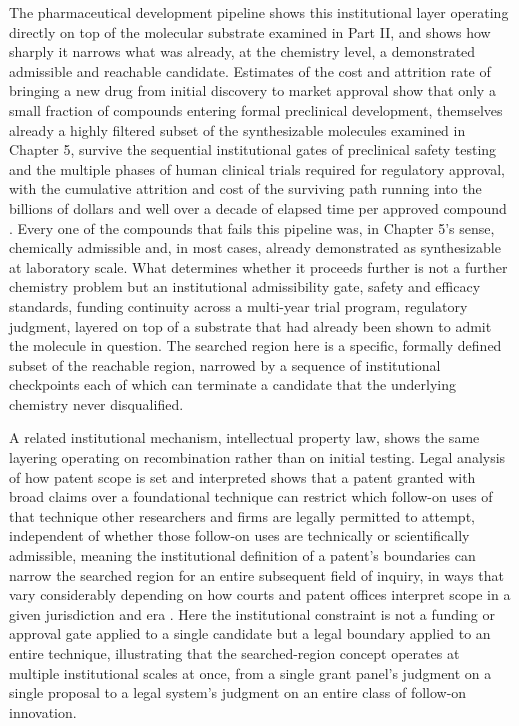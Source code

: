 \documentclass[11pt]{book}
\begin{document}
The pharmaceutical development pipeline shows this institutional layer operating directly on top of the molecular substrate examined in Part II, and shows how sharply it narrows what was already, at the chemistry level, a demonstrated admissible and reachable candidate. Estimates of the cost and attrition rate of bringing a new drug from initial discovery to market approval show that only a small fraction of compounds entering formal preclinical development, themselves already a highly filtered subset of the synthesizable molecules examined in Chapter 5, survive the sequential institutional gates of preclinical safety testing and the multiple phases of human clinical trials required for regulatory approval, with the cumulative attrition and cost of the surviving path running into the billions of dollars and well over a decade of elapsed time per approved compound \cite{dimasi2016}. Every one of the compounds that fails this pipeline was, in Chapter 5's sense, chemically admissible and, in most cases, already demonstrated as synthesizable at laboratory scale. What determines whether it proceeds further is not a further chemistry problem but an institutional admissibility gate, safety and efficacy standards, funding continuity across a multi-year trial program, regulatory judgment, layered on top of a substrate that had already been shown to admit the molecule in question. The searched region here is a specific, formally defined subset of the reachable region, narrowed by a sequence of institutional checkpoints each of which can terminate a candidate that the underlying chemistry never disqualified.

A related institutional mechanism, intellectual property law, shows the same layering operating on recombination rather than on initial testing. Legal analysis of how patent scope is set and interpreted shows that a patent granted with broad claims over a foundational technique can restrict which follow-on uses of that technique other researchers and firms are legally permitted to attempt, independent of whether those follow-on uses are technically or scientifically admissible, meaning the institutional definition of a patent's boundaries can narrow the searched region for an entire subsequent field of inquiry, in ways that vary considerably depending on how courts and patent offices interpret scope in a given jurisdiction and era \cite{mergesnelson1990}. Here the institutional constraint is not a funding or approval gate applied to a single candidate but a legal boundary applied to an entire technique, illustrating that the searched-region concept operates at multiple institutional scales at once, from a single grant panel's judgment on a single proposal to a legal system's judgment on an entire class of follow-on innovation.
\end{document}
